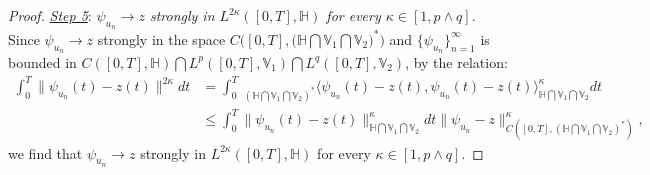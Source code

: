 \documentclass[11pt]{article}
\renewcommand{\leq}{\leqslant}
\numberwithin{equation}{section}
\begin{document}
\begin{proof}
\underline{\emph{Step 5}}: \emph{$\psi_{u_n}\rightarrow z$ strongly in $L^{2\kappa}([0,T],\mathbb{H})$
for every  $\kappa\in[1,p\wedge q]$}.
Since $\psi_{u_n}\rightarrow z$ strongly in the space
$C\big([0,T],\big(\mathbb{H}\bigcap\mathbb{V}_1
\bigcap\mathbb{V}_2\big)^*\big)$ and $\{\psi_{u_n}\}_{n=1}^\infty$ is bounded in $C([0,T],\mathbb{H} )\bigcap L^p([0,T], \mathbb{V}_1  ) \bigcap L^q([0,T], \mathbb{V}_2)$, by the relation:
\begin{align*}
 \int_0^T\|\psi_{u_n}(t)-z(t)
\|^{2\kappa}dt&= \int_0^T\  _{(\mathbb{H}\bigcap\mathbb{V}_1
\bigcap\mathbb{V}_2)^*}
\big\langle \psi_{u_n}(t)-z(t),
\psi_{u_n}(t)-z(t)\big  \rangle_{\mathbb{H}\bigcap\mathbb{V}_1
\bigcap\mathbb{V}_2}^\kappa dt
\nonumber\\&\leq
\int_0^T\|\psi_{u_n}(t)-z(t)
\|_{\mathbb{H}\bigcap\mathbb{V}_1
\bigcap\mathbb{V}_2}^\kappa dt
\|\psi_{u_n}-z
\|_{C([0,T],(\mathbb{H}\bigcap\mathbb{V}_1
\bigcap\mathbb{V}_2)^*)}^\kappa,
\end{align*}
we find that $\psi_{u_n}\rightarrow z$ strongly in $L^{2\kappa}([0,T],\mathbb{H})$ for every $\kappa\in[1,p\wedge q]$.


\end{proof}
\end{document}
